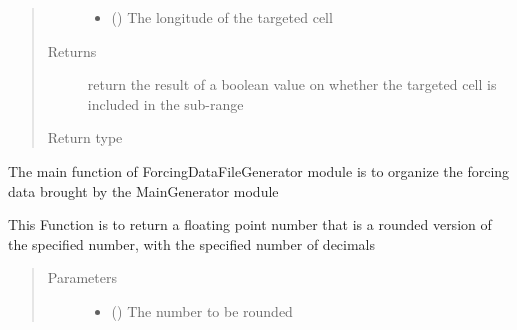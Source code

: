 \documentclass[letterpaper,10pt,english]{sphinxmanual}
\begin{document}
\begin{fulllineitems}
\begin{fulllineitems}
\begin{quote}
\begin{description}
\begin{itemize}
\item {} 
 () \textendash{} The longitude of the targeted cell

\end{itemize}

\item[{Returns}] \leavevmode
return the result of a boolean value on whether the targeted cell is included in the sub-range

\item[{Return type}] \leavevmode
{}

\end{description}\end{quote}

\end{fulllineitems}


\begin{fulllineitems}
\label{\detokenize{AgentTools.GenericModelAgent:AgentTools.GenericModelAgent.ForcingDataFileGenerator.ForcingDataFileGenerator.compute}}
The main function of ForcingDataFileGenerator module is to organize the forcing data brought by the MainGenerator module

\end{fulllineitems}


\begin{fulllineitems}
\label{\detokenize{AgentTools.GenericModelAgent:AgentTools.GenericModelAgent.ForcingDataFileGenerator.ForcingDataFileGenerator.exact_rounding}}
This Function is to return a floating point number that is a rounded version of the specified number, with the specified number of decimals
\begin{quote}\begin{description}
\item[{Parameters}] \leavevmode\begin{itemize}
\item {} 
 () \textendash{} The number to be rounded


\end{itemize}
\end{description}
\end{quote}
\end{fulllineitems}
\end{fulllineitems}
\end{document}
